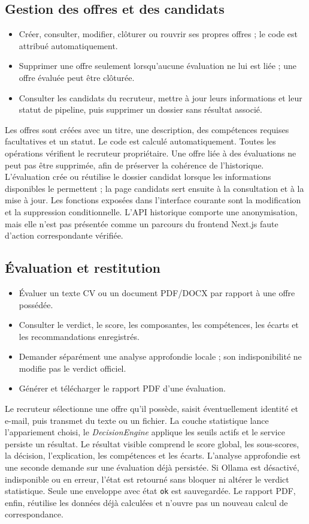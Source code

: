 \subsection{Gestion des offres et des candidats}
\begin{itemize}
  \item Créer, consulter, modifier, clôturer ou rouvrir ses propres offres ; le code est attribué automatiquement.
  \item Supprimer une offre seulement lorsqu'aucune évaluation ne lui est liée ; une offre évaluée peut être clôturée.
  \item Consulter les candidats du recruteur, mettre à jour leurs informations et leur statut de pipeline, puis supprimer un dossier sans résultat associé.
\end{itemize}

Les offres sont créées avec un titre, une description, des compétences requises facultatives et un statut. Le code est calculé automatiquement. Toutes les opérations vérifient le recruteur propriétaire. Une offre liée à des évaluations ne peut pas être supprimée, afin de préserver la cohérence de l'historique. L'évaluation crée ou réutilise le dossier candidat lorsque les informations disponibles le permettent ; la page candidats sert ensuite à la consultation et à la mise à jour. Les fonctions exposées dans l'interface courante sont la modification et la suppression conditionnelle. L'API historique comporte une anonymisation, mais elle n'est pas présentée comme un parcours du frontend Next.js faute d'action correspondante vérifiée.

\subsection{Évaluation et restitution}
\begin{itemize}
  \item Évaluer un texte CV ou un document PDF/DOCX par rapport à une offre possédée.
  \item Consulter le verdict, le score, les composantes, les compétences, les écarts et les recommandations enregistrés.
  \item Demander séparément une analyse approfondie locale ; son indisponibilité ne modifie pas le verdict officiel.
  \item Générer et télécharger le rapport PDF d'une évaluation.
\end{itemize}

Le recruteur sélectionne une offre qu'il possède, saisit éventuellement identité et e-mail, puis transmet du texte ou un fichier. La couche statistique lance l'appariement choisi, le \textit{DecisionEngine} applique les seuils actifs et le service persiste un résultat. Le résultat visible comprend le score global, les sous-scores, la décision, l'explication, les compétences et les écarts. L'analyse approfondie est une seconde demande sur une évaluation déjà persistée. Si Ollama est désactivé, indisponible ou en erreur, l'état est retourné sans bloquer ni altérer le verdict statistique. Seule une enveloppe avec état \texttt{ok} est sauvegardée. Le rapport PDF, enfin, réutilise les données déjà calculées et n'ouvre pas un nouveau calcul de correspondance.

